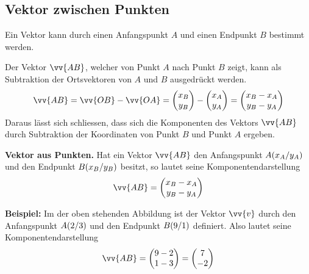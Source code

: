 \subsection{Vektor zwischen Punkten}

Ein Vektor kann durch einen Anfangspunkt $A$ und einen Endpunkt $B$ bestimmt werden.

\begin{center}
\end{center}
Der Vektor $\vv{AB}$, welcher von Punkt $A$ nach Punkt $B$ zeigt, kann als Subtraktion der Ortsvektoren von $A$ und $B$ ausgedrückt werden.
\[
  \vv{AB} = \vv{OB} - \vv{OA} = \vxy{x_{B},y_{B}} - \vxy{x_{A},y_{A}} = \vxy{x_{B}-x_{A},y_{B}-y_{A}}
\]
Daraus lässt sich schliessen, dass sich die Komponenten des Vektors $\vv{AB}$ durch Subtraktion der Koordinaten von Punkt $B$ und Punkt $A$ ergeben.


\begin{theorem}
  \textbf{Vektor aus Punkten.} Hat ein Vektor $\vv{AB}$ den Anfangspunkt $\pxy[A]{x_{A},y_{A}}$ und den Endpunkt $\pxy[B]{x_{B},y_{B}}$ besitzt, so lautet seine Komponentendarstellung
  \[
    \vv{AB} = \vxy{x_{B}-x_{A},y_{B}-y_{A}}
  \]
\end{theorem}

\begin{example}
  \textbf{Beispiel:} Im der oben stehenden Abbildung ist der Vektor $\vv{v}$ durch den Anfangspunkt $\pxy[A]{2,3}$ und den Endpunkt $\pxy[B]{9,1}$ definiert. Also lautet seine Komponentendarstellung
  \[
    \vv{AB} = \vxy{9-2,1-3} = \vxy{7,-2}
  \]
\end{example}
